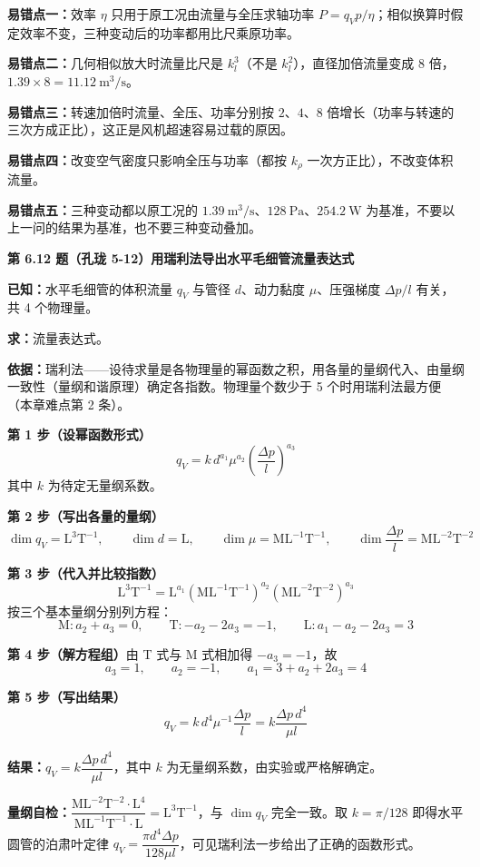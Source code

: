 \begin{yicuo}
\textbf{易错点一：}效率 $\eta$ 只用于原工况由流量与全压求轴功率 $P=q_Vp/\eta$；相似换算时假定效率不变，三种变动后的功率都用比尺乘原功率。

\textbf{易错点二：}几何相似放大时流量比尺是 $k_l^{3}$（不是 $k_l^{2}$），直径加倍流量变成 8 倍，$1.39\times8=11.12\ \mathrm{m^3/s}$。

\textbf{易错点三：}转速加倍时流量、全压、功率分别按 $2$、$4$、$8$ 倍增长（功率与转速的三次方成正比），这正是风机超速容易过载的原因。

\textbf{易错点四：}改变空气密度只影响全压与功率（都按 $k_\rho$ 一次方正比），不改变体积流量。

\textbf{易错点五：}三种变动都以原工况的 $1.39\ \mathrm{m^3/s}$、$128\ \mathrm{Pa}$、$254.2\ \mathrm{W}$ 为基准，不要以上一问的结果为基准，也不要三种变动叠加。
\end{yicuo}

\noindent\textbf{第 6.12 题（孔珑 5-12）\quad 用瑞利法导出水平毛细管流量表达式}

\begin{jie}
\textbf{已知：}水平毛细管的体积流量 $q_V$ 与管径 $d$、动力黏度 $\mu$、压强梯度 $\Delta p/l$ 有关，共 4 个物理量。

\textbf{求：}流量表达式。

\textbf{依据：}瑞利法——设待求量是各物理量的幂函数之积，用各量的量纲代入、由量纲一致性（量纲和谐原理）确定各指数。物理量个数少于 5 个时用瑞利法最方便（本章难点第 2 条）。

\textbf{第 1 步（设幂函数形式）}\quad
\[q_V=k\,d^{a_1}\mu^{a_2}\left(\frac{\Delta p}{l}\right)^{a_3}\]
其中 $k$ 为待定无量纲系数。

\textbf{第 2 步（写出各量的量纲）}\quad
\[\dim q_V=\mathrm{L^{3}T^{-1}},\qquad \dim d=\mathrm{L},\qquad \dim\mu=\mathrm{ML^{-1}T^{-1}},\qquad \dim\frac{\Delta p}{l}=\mathrm{ML^{-2}T^{-2}}\]

\textbf{第 3 步（代入并比较指数）}\quad
\[\mathrm{L^{3}T^{-1}}=\mathrm{L}^{a_1}\left(\mathrm{ML^{-1}T^{-1}}\right)^{a_2}\left(\mathrm{ML^{-2}T^{-2}}\right)^{a_3}\]
按三个基本量纲分别列方程：
\[\mathrm{M}:a_2+a_3=0,\qquad \mathrm{T}:-a_2-2a_3=-1,\qquad \mathrm{L}:a_1-a_2-2a_3=3\]

\textbf{第 4 步（解方程组）}\quad 由 T 式与 M 式相加得 $-a_3=-1$，故
\[a_3=1,\qquad a_2=-1,\qquad a_1=3+a_2+2a_3=4\]

\textbf{第 5 步（写出结果）}\quad
\[q_V=k\,d^{4}\mu^{-1}\frac{\Delta p}{l}=k\frac{\Delta p\,d^{4}}{\mu l}\]

\textbf{结果：}$q_V=k\dfrac{\Delta p\,d^{4}}{\mu l}$，其中 $k$ 为无量纲系数，由实验或严格解确定。

\textbf{量纲自检：}$\dfrac{\mathrm{ML^{-2}T^{-2}}\cdot\mathrm{L^{4}}}{\mathrm{ML^{-1}T^{-1}}\cdot\mathrm{L}}=\mathrm{L^{3}T^{-1}}$，与 $\dim q_V$ 完全一致。取 $k=\pi/128$ 即得水平圆管的泊肃叶定律 $q_V=\dfrac{\pi d^{4}\Delta p}{128\mu l}$，可见瑞利法一步给出了正确的函数形式。
\end{jie}


